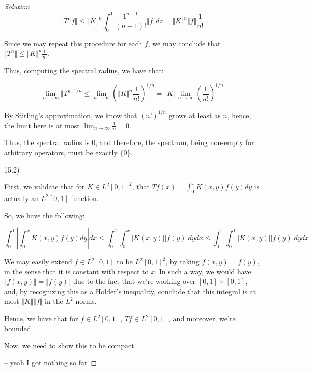 \documentclass[10pt]{article}
\begin{document}
\begin{proof}[Solution]
$$ \Vert T^n f \Vert \leq \Vert K \Vert^n \int_0^1 \frac{1^{n-1}}{(n-1)!} \Vert f \Vert dz = \Vert K \Vert^n \Vert f \Vert \frac{1}{n!}$$

Since we may repeat this procedure for each $f$, we may conclude that $\Vert T^n \Vert \leq \Vert K \Vert^n \frac{1}{n!}$.

Thus, computing the spectral radius, we have that:

$$ \lim_{n \to \infty} \Vert T^n \Vert ^{1/n} \leq \lim_{n \to \infty} \left(  \Vert K \Vert^n \frac{1}{n!} \right)^{1/n} = \Vert K \Vert \lim_{n \to \infty} \left(\frac{1}{n!}\right)^{1/n}$$

By Stirling's approximation, we know that $(n!)^{1/n}$ grows at least as $n$, hence, the limit here is at most $\lim_{n \to \infty} \frac{1}{n} = 0$.

Thus, the spectral radius is $0$, and therefore, the spectrum, being non-empty for arbitrary operators, must be exactly $\{ 0 \}$. 

15.2)

First, we validate that for $K \in L^2[0,1]^2$, that $Tf(x) = \int_0^x K(x,y) f(y) dy$ is actually an $L^2[0,1]$ function.

So, we have the following:

$$ \int_0^1 \left| \int_0^x K(x,y) f(y) dy \right| dx  \leq \int_0^1 \int_0^x |K(x,y)| |f(y)| dy dx \leq \int_0^1 \int_0^1 |K(x, y)| |f(y)| dy dx $$

We may easily extend $f \in L^2[0,1]$ to be $L^2[0,1]^2$, by taking $f(x,y) = f(y)$, in the sense that it is constant with respect to $x$. In such a way, we would have $\Vert f(x,y) \Vert = \Vert f(y) \Vert$ due to the fact that we're working over $[0,1] \times [0,1]$, and, by recognizing this as a H\"older's inequality, conclude that this integral is at most $\Vert K \Vert \Vert f \Vert$ in the $L^2$ norms.

Hence, we have that for $f \in L^2[0,1]$, $Tf \in L^2[0,1]$, and moreover, we're bounded.

Now, we need to show this to be compact. 

-- yeah I got nothing so far

\end{proof}
\end{document}
